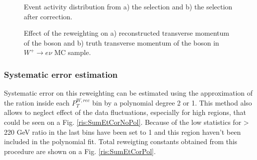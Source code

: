 \begin{figure}[!tbp]
\begin{minipage}[h]{0.5\linewidth}
\end{minipage}
\hfill
\begin{minipage}[h]{0.5\linewidth}
\end{minipage}
\caption{Event activity \sumet distribution from a) the \wenu selection and b) the \wmunu selection after \sumet correction. }
\label{HadrRecoil:CorrSumet}
\end{figure}

\begin{figure}[!tbp]
\begin{minipage}[h]{0.49\linewidth}
\end{minipage}
\hfill
\begin{minipage}[h]{0.49\linewidth}
\end{minipage}
\caption{Effect of the \sumet reweighting on a) reconstructed transverse momentum of the boson and b) truth transverse momentum of the boson in $W^{+} \to e\nu$ MC sample.}
\label{HadrRecoil:PtSpectrum}
\end{figure}

\subsubsection{Systematic error estimation}

Systematic error on this reweighting can be estimated using the approximation of the ration inside each $P_T^{W, rec}$ bin by a polynomial degree 2 or 1. This method also allows to neglect effect of the data fluctuations, especially for high \sumet regions, that could be seen on a Fig. \ref{ris:SumEtCorNoPol}. Because of the low statistics for \sumet > 220 GeV ratio in the last bins have been set to 1 and this region haven't been included in the polynomial fit. Total reweigting constants obtained from this procedure are shown on a Fig. \ref{ris:SumEtCorPol}. 

